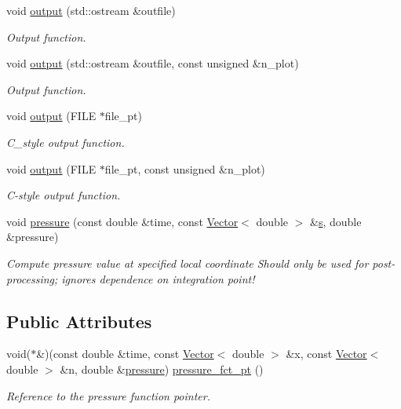 \begin{DoxyCompactItemize}
void \hyperlink{classoomph_1_1DarcyFaceElement_aff94487a830df70d037c56d15fd4c462}{output} (std\+::ostream \&outfile)
\begin{DoxyCompactList}\small\item\em Output function. \end{DoxyCompactList}\item 
void \hyperlink{classoomph_1_1DarcyFaceElement_a74a836ffad2d7a2f219228fb01009026}{output} (std\+::ostream \&outfile, const unsigned \&n\+\_\+plot)
\begin{DoxyCompactList}\small\item\em Output function. \end{DoxyCompactList}\item 
void \hyperlink{classoomph_1_1DarcyFaceElement_a5231113fc85a786c280ebfc4b316a19c}{output} (F\+I\+LE $\ast$file\+\_\+pt)
\begin{DoxyCompactList}\small\item\em C\+\_\+style output function. \end{DoxyCompactList}\item 
void \hyperlink{classoomph_1_1DarcyFaceElement_a52b0382a8519d2efcb599cdd52400477}{output} (F\+I\+LE $\ast$file\+\_\+pt, const unsigned \&n\+\_\+plot)
\begin{DoxyCompactList}\small\item\em C-\/style output function. \end{DoxyCompactList}\item 
void \hyperlink{classoomph_1_1DarcyFaceElement_acb4492022eed505e3b41ee47a6b3bcaa}{pressure} (const double \&time, const \hyperlink{classoomph_1_1Vector}{Vector}$<$ double $>$ \&\hyperlink{cfortran_8h_ab7123126e4885ef647dd9c6e3807a21c}{s}, double \&pressure)
\begin{DoxyCompactList}\small\item\em Compute pressure value at specified local coordinate Should only be used for post-\/processing; ignores dependence on integration point! \end{DoxyCompactList}\end{DoxyCompactItemize}
\subsection*{Public Attributes}
\begin{DoxyCompactItemize}
\item 
void($\ast$\&)(const double \&time, const \hyperlink{classoomph_1_1Vector}{Vector}$<$ double $>$ \&x, const \hyperlink{classoomph_1_1Vector}{Vector}$<$ double $>$ \&n, double \&\hyperlink{classoomph_1_1DarcyFaceElement_acb4492022eed505e3b41ee47a6b3bcaa}{pressure}) \hyperlink{classoomph_1_1DarcyFaceElement_a0e7484949e8e729373a47073fb9d0ac9}{pressure\+\_\+fct\+\_\+pt} ()
\begin{DoxyCompactList}\small\item\em Reference to the pressure function pointer. \end{DoxyCompactList}\end{DoxyCompactItemize}
